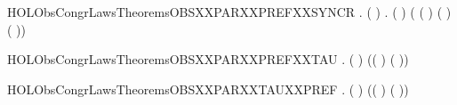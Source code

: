 \begin{SaveVerbatim}{HOLObsCongrLawsTheoremsOBSXXPARXXPREFXXSYNCR}
\HOLTokenTurnstile{} \HOLSymConst{\HOLTokenForall{}} .
       ( \HOLSymConst{=}  ) \HOLSymConst{\HOLTokenImp{}}
       \HOLSymConst{\HOLTokenForall{}} .
            (  \HOLSymConst{\ensuremath{\parallel}}  )
             ( ( \HOLSymConst{\ensuremath{\parallel}}  ) \HOLSymConst{\ensuremath{+}}
               (  \HOLSymConst{\ensuremath{\parallel}} ) \HOLSymConst{\ensuremath{+}} \HOLConst{\ensuremath{\tau}}( \HOLSymConst{\ensuremath{\parallel}} ))
\end{SaveVerbatim}
\newcommand{\HOLObsCongrLawsTheoremsOBSXXPARXXPREFXXSYNCR}{\UseVerbatim{HOLObsCongrLawsTheoremsOBSXXPARXXPREFXXSYNCR}}
\begin{SaveVerbatim}{HOLObsCongrLawsTheoremsOBSXXPARXXPREFXXTAU}
\HOLTokenTurnstile{} \HOLSymConst{\HOLTokenForall{}}  .
        ( \HOLSymConst{\ensuremath{\parallel}} \HOLConst{\ensuremath{\tau}})
         (( \HOLSymConst{\ensuremath{\parallel}} \HOLConst{\ensuremath{\tau}}) \HOLSymConst{\ensuremath{+}} \HOLConst{\ensuremath{\tau}}( \HOLSymConst{\ensuremath{\parallel}} ))
\end{SaveVerbatim}
\newcommand{\HOLObsCongrLawsTheoremsOBSXXPARXXPREFXXTAU}{\UseVerbatim{HOLObsCongrLawsTheoremsOBSXXPARXXPREFXXTAU}}
\begin{SaveVerbatim}{HOLObsCongrLawsTheoremsOBSXXPARXXTAUXXPREF}
\HOLTokenTurnstile{} \HOLSymConst{\HOLTokenForall{}}  .
        (\HOLConst{\ensuremath{\tau}} \HOLSymConst{\ensuremath{\parallel}} )
         (\HOLConst{\ensuremath{\tau}}( \HOLSymConst{\ensuremath{\parallel}} ) \HOLSymConst{\ensuremath{+}} (\HOLConst{\ensuremath{\tau}} \HOLSymConst{\ensuremath{\parallel}} ))
\end{SaveVerbatim}
